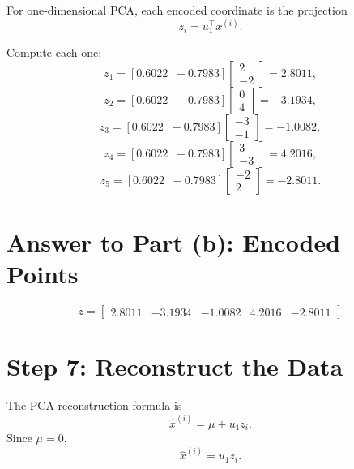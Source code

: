\documentclass[11pt]{article}
\begin{document}
For one-dimensional PCA, each encoded coordinate is the projection
\[
    z_i = u_1^\top x^{(i)}.
\]

Compute each one:
\[
    z_1 = [0.6022\;\; -0.7983]
    \begin{bmatrix}
        2\\
        -2
    \end{bmatrix}
    = 2.8011,
\]
\[
    z_2 = [0.6022\;\; -0.7983]
    \begin{bmatrix}
        0\\
        4
    \end{bmatrix}
    = -3.1934,
\]
\[
    z_3 = [0.6022\;\; -0.7983]
    \begin{bmatrix}
        -3\\
        -1
    \end{bmatrix}
    = -1.0082,
\]
\[
    z_4 = [0.6022\;\; -0.7983]
    \begin{bmatrix}
        3\\
        -3
    \end{bmatrix}
    = 4.2016,
\]
\[
    z_5 = [0.6022\;\; -0.7983]
    \begin{bmatrix}
        -2\\
        2
    \end{bmatrix}
    = -2.8011.
\]

\section*{Answer to Part (b): Encoded Points}

\[
    \boxed{
    z=
    \begin{bmatrix}
        2.8011 &
        -3.1934 &
        -1.0082 &
        4.2016 &
        -2.8011
    \end{bmatrix}
    }
\]

\section*{Step 7: Reconstruct the Data}

The PCA reconstruction formula is
\[
    \hat{x}^{(i)} = \mu + u_1 z_i.
\]
Since \(\mu=0\),
\[
    \hat{x}^{(i)}=u_1 z_i.
\]
\end{document}

